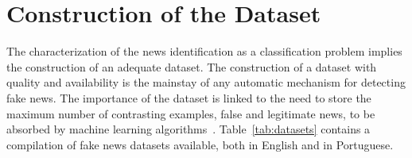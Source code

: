 \documentclass{ieeeaccess}
\begin{document}



\section{Construction of the Dataset} %
\label{sec:base}

The characterization of the news identification as a classification problem implies the construction of an adequate dataset. The construction of a dataset with quality and availability is the mainstay of any automatic mechanism for detecting fake news. The importance of the dataset is linked to the need to store the maximum number of contrasting examples, false and legitimate news, to be absorbed by machine learning algorithms~\cite{oshikawa2018survey}. Table~\ref{tab:datasets} contains a compilation of fake news datasets available, both in English and in Portuguese. %

\end{document}
